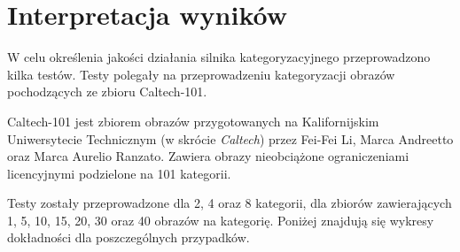 \chapter{Interpretacja wyników}

W celu określenia jakości działania silnika kategoryzacyjnego przeprowadzono kilka testów. Testy polegały na przeprowadzeniu kategoryzacji obrazów pochodzących ze zbioru Caltech-101.\cite{CALTECH101}

Caltech-101 jest zbiorem obrazów przygotowanych na Kalifornijskim Uniwersytecie Technicznym (w skrócie \emph{Caltech}) przez Fei-Fei Li, Marca Andreetto oraz Marca Aurelio Ranzato. Zawiera obrazy nieobciążone ograniczeniami licencyjnymi podzielone na 101 kategorii.

Testy zostały przeprowadzone dla 2, 4 oraz 8 kategorii, dla zbiorów zawierających 1, 5, 10, 15, 20, 30 oraz 40 obrazów na kategorię. Poniżej znajdują się wykresy dokładności dla poszczególnych przypadków.

